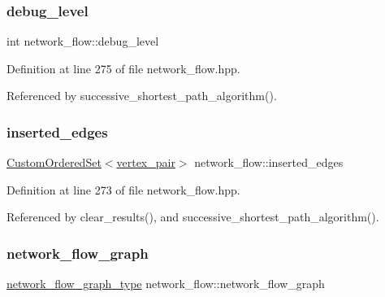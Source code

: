 \subsubsection{\texorpdfstring{debug\+\_\+level}{debug\_level}}
{\footnotesize\ttfamily int network\+\_\+flow\+::debug\+\_\+level\hspace{0.3cm}{\ttfamily [private]}}



Definition at line 275 of file network\+\_\+flow.\+hpp.



Referenced by successive\+\_\+shortest\+\_\+path\+\_\+algorithm().

\mbox{\label{classnetwork__flow_a27d1ff9debb67be0cd37cb160e83e663}} 
\subsubsection{\texorpdfstring{inserted\+\_\+edges}{inserted\_edges}}
{\footnotesize\ttfamily \hyperlink{classCustomOrderedSet}{Custom\+Ordered\+Set}$<$\hyperlink{classnetwork__flow_a7a59f52da10f126268707c9097a37442}{vertex\+\_\+pair}$>$ network\+\_\+flow\+::inserted\+\_\+edges\hspace{0.3cm}{\ttfamily [private]}}



Definition at line 273 of file network\+\_\+flow.\+hpp.



Referenced by clear\+\_\+results(), and successive\+\_\+shortest\+\_\+path\+\_\+algorithm().

\mbox{\label{classnetwork__flow_ad9ab04ac79b18ed458320576340d14d7}} 
\subsubsection{\texorpdfstring{network\+\_\+flow\+\_\+graph}{network\_flow\_graph}}
{\footnotesize\ttfamily \hyperlink{classnetwork__flow_abfdb8d1baba183c2b121f8c078b9b640}{network\+\_\+flow\+\_\+graph\+\_\+type} network\+\_\+flow\+::network\+\_\+flow\+\_\+graph}




